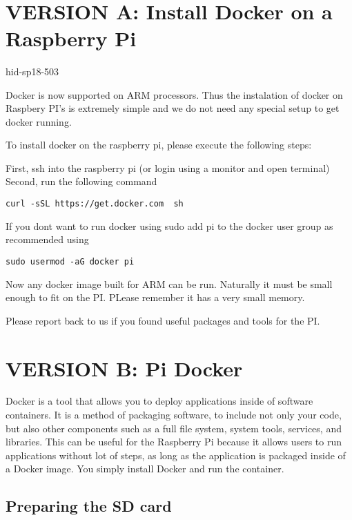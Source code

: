 \MDNAME\

\section{VERSION A: Install Docker on a Raspberry Pi}

hid-sp18-503

Docker is now supported on ARM processors. Thus the instalation of
docker on Raspbery PI's is extremely simple and we do not need any
special setup to get docker running.

To install docker on the raspberry pi, please execute the following
steps:

First, ssh into the raspberry pi (or login using a monitor and open
terminal) Second, run the following command

\texttt{curl\ -sSL\ https://get.docker.com\ \textbar{}\ sh}

If you dont want to run docker using sudo add pi to the docker user
group as recommended using

\texttt{sudo\ usermod\ -aG\ docker\ pi}

Now any docker image built for ARM can be run. Naturally it must be
small enough to fit on the PI. PLease remember it has a very small
memory.

Please report back to us if you found useful packages and tools for the
PI.

\section{VERSION B: Pi Docker}

Docker is a tool that allows you to deploy applications inside of
software containers. It is a method of packaging software, to include
not only your code, but also other components such as a full file
system, system tools, services, and libraries. This can be useful for
the Raspberry Pi because it allows users to run applications without lot
of steps, as long as the application is packaged inside of a Docker
image. You simply install Docker and run the container.

\subsection{Preparing the SD card}

